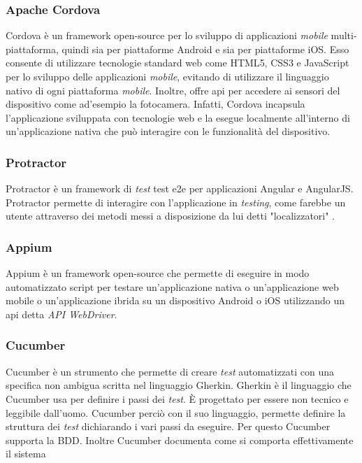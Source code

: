 \subsubsection*{Apache Cordova}
Cordova è un \gls{framework}\ap{[g]} \gls{open-source}\ap{[g]} per lo sviluppo di applicazioni \emph{mobile} multi-piattaforma, quindi sia per piattaforme \gls{Android} e sia per piattaforme \gls{iOS}. Esso consente di utilizzare tecnologie standard web come \gls{HTML}5, \gls{CSS}3 e JavaScript per lo sviluppo delle applicazioni \emph{mobile}, evitando di utilizzare il linguaggio nativo di ogni piattaforma \emph{mobile}. Inoltre, offre \gls{api}\ap{[g]} per accedere ai sensori del dispositivo come ad'esempio la fotocamera. Infatti, Cordova incapsula l'applicazione sviluppata con tecnologie web e la esegue localmente all’interno di un’applicazione nativa che può interagire con le funzionalità del dispositivo.

\subsubsection*{Protractor}
Protractor è un \gls{framework}\ap{[g]} di \emph{test} \gls{test e2e}\ap{[g]} per applicazioni Angular e AngularJS. Protractor permette di interagire con l'applicazione in \emph{testing}, come farebbe un utente attraverso dei metodi messi a disposizione da lui detti "localizzatori" .

\subsubsection*{Appium}
Appium è un \gls{framework}\ap{[g]} \gls{open-source}\ap{[g]} che permette di eseguire in modo automatizzato script per testare un'\gls{applicazione nativa}\ap{[g]} o un'\gls{applicazione web mobile}\ap{[g]} o un'\gls{applicazione ibrida}\ap{[g]} su un dispositivo \gls{Android}\ap{[g]} o \gls{iOS}\ap{[g]} utilizzando un \gls{api}\ap{[g]} detta \emph{API WebDriver}.

\subsubsection*{Cucumber}
Cucumber è un strumento che permette di creare \emph{test} automatizzati con una specifica non ambigua scritta nel linguaggio Gherkin. Gherkin è il linguaggio che Cucumber usa per definire i passi dei \emph{test}. È progettato per essere non tecnico e leggibile dall'uomo. Cucumber perciò con il suo linguaggio, permette definire la struttura dei \emph{test} dichiarando i vari passi da eseguire. Per questo Cucumber supporta la \gls{BDD}\glsfirstoccur. Inoltre Cucumber documenta come si comporta effettivamente il sistema

